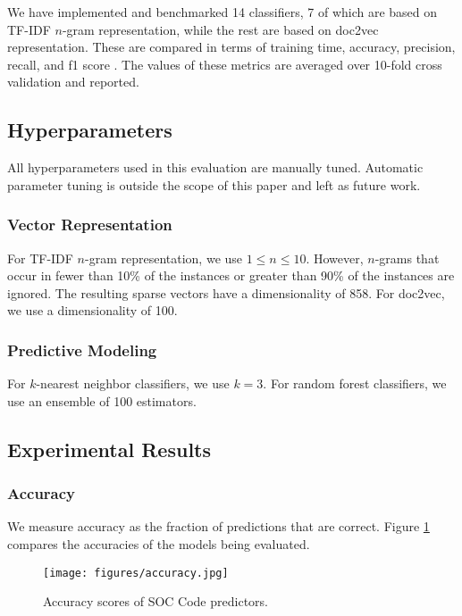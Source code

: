 We have implemented and benchmarked 14 classifiers, 7 of which are based on TF-IDF $n$-gram representation, while the rest are based on doc2vec representation. These are compared in terms of training time, accuracy, precision, recall, and f1 score \cite{scikit-learn-metrics}.  The values of these metrics are averaged over 10-fold cross validation and reported.

\subsection{Hyperparameters}

All hyperparameters used in this evaluation are manually tuned. Automatic parameter tuning is outside the scope of this paper and left as future work.

\subsubsection{Vector Representation}

For TF-IDF $n$-gram representation, we use $ 1 \leq n \leq 10$. However, $n$-grams that occur in fewer than 10\% of the instances or greater than 90\% of the instances are ignored. The resulting sparse vectors have a dimensionality of 858. For doc2vec, we use a dimensionality of 100.

\subsubsection{Predictive Modeling}

For $k$-nearest neighbor classifiers, we use $k = 3$. For random forest classifiers, we use an ensemble of 100 estimators.

\subsection{Experimental Results}

\subsubsection{Accuracy}

We measure accuracy as the fraction of predictions that are correct. Figure \ref{fig:Accuracy} compares the accuracies of the models being evaluated.
\begin{figure}[h!]
    \centering
    \texttt{[image: figures/accuracy.jpg]}
    \caption{Accuracy scores of SOC Code predictors.}
    \label{fig:Accuracy}
\end{figure}

